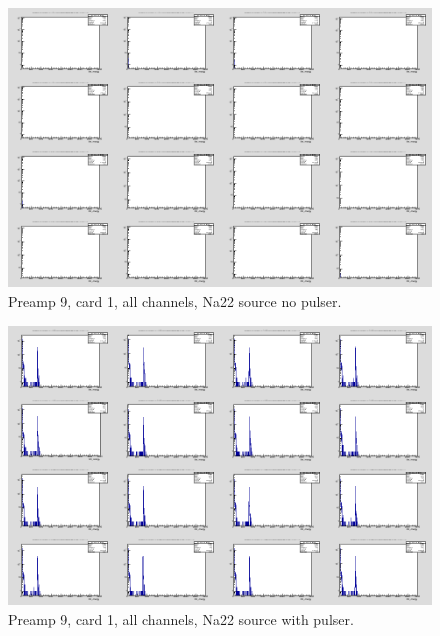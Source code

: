 \documentclass{report}
\begin{document}
\begin{figure}[!htb]
  \includegraphics[width=\linewidth]{dr_latest_test/preamp9_lim_energy_card1_all_no_pulser.png}
  \caption{Preamp 9, card 1, all channels, Na22 source  no pulser.}
\end{figure}
\begin{figure}[!htb]
  \includegraphics[width=\linewidth]{dr_latest_test/preamp9_lim_energy_card1_pulser.png}
  \caption{Preamp 9, card 1, all channels, Na22 source with pulser.}
\end{figure}
\newpage
\clearpage
\end{document}
